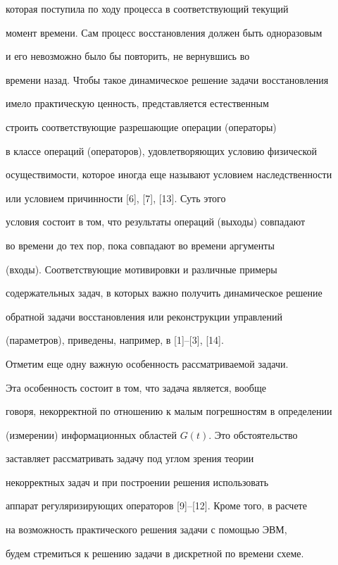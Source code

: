 которая поступила по ходу процесса в соответствующий текущий 


момент времени. Сам процесс восстановления должен быть одноразовым 


и его невозможно было бы повторить, не вернувшись во 


времени назад. Чтобы такое динамическое решение задачи восстановления 


имело практическую ценность, представляется естественным 


строить соответствующие разрешающие операции (операторы) 


в классе операций (операторов), удовлетворяющих условию физической 


осуществимости, которое иногда еще называют условием наследственности 


или условием причинности [6], [7], [13]. Суть этого 


условия состоит в том, что результаты операций (выходы) совпадают 


во времени до тех пор, пока совпадают во времени аргументы 


(входы). Соответствующие мотивировки и различные примеры 


содержательных задач, в которых важно получить динамическое решение 


обратной задачи восстановления или реконструкции управлений 


(параметров), приведены, например, в [1]--[3], [14]. 


 


Отметим еще одну важную особенность рассматриваемой задачи. 


Эта особенность состоит в том, что задача является, вообще 


говоря, некорректной по отношению к малым погрешностям в определении 


(измерении) информационных областей $G(t)$. Это обстоятельство 


заставляет рассматривать задачу под углом зрения теории 


некорректных задач и при построении решения использовать 


аппарат регуляризирующих операторов [9]--[12]. Кроме того, в расчете 


на возможность практического решения задачи с помощью ЭВМ, 


будем стремиться к решению задачи в дискретной по времени схеме. 


